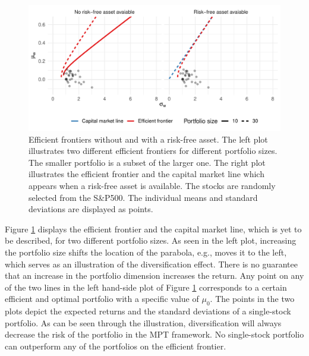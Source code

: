\documentclass[12pt, twoside]{book}\usepackage{knitr}
\begin{document}
\begin{knitrout}\small
{}\color{fgcolor}\begin{figure}

{\centering \includegraphics[width=\maxwidth]{figure/mertons_efficient_frontier-1} 

}

\caption[Efficient frontiers without and with a risk-free asset]{Efficient frontiers without and with a risk-free asset. The left plot illustrates two different efficient frontiers for different portfolio sizes. The smaller portfolio is a subset of the larger one. The right plot illustrates the efficient frontier and the capital market line which appears when a risk-free asset is available. The stocks are randomly selected from the S\&P500. The individual means and standard deviations are displayed as points.}\label{fig:mertons_efficient_frontier}
\end{figure}

\end{knitrout}
Figure \ref{fig:mertons_efficient_frontier} displays the efficient frontier and the capital market line, which is yet to be described, for two different portfolio sizes. 
As seen in the left plot, increasing the portfolio size shifts the location of the parabola, e.g., moves it to the left, which serves as an illustration of the diversification effect. 
There is no guarantee that an increase in the portfolio dimension increases the return.
Any point on any of the two lines in the left hand-side plot of Figure \ref{fig:mertons_efficient_frontier} corresponds to a certain efficient and optimal portfolio with a specific value of $\mu_0$. 
The points in the two plots depict the expected returns and the standard deviations of a single-stock portfolio. 
As can be seen through the illustration, diversification will always decrease the risk of the portfolio in the MPT framework. 
No single-stock portfolio can outperform any of the portfolios on the efficient frontier. 
\end{document}
